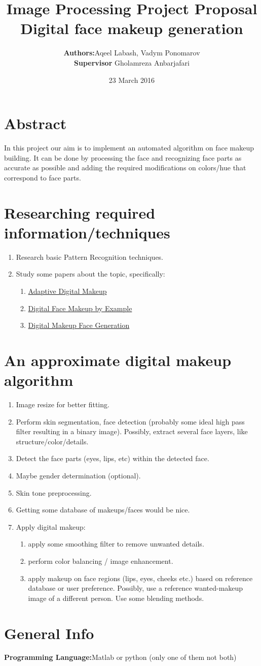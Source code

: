 \documentclass{article}
\title{Image Processing Project Proposal\\
Digital face makeup generation}
\author{\textbf{Authors:}Aqeel Labash, Vadym Ponomarov\\ 
	\textbf{Supervisor} Gholamreza Anbarjafari}
\date{23 March 2016}
\begin{document}
	\maketitle
\section*{Abstract}
In this project our aim is to implement an automated algorithm on face makeup building. It can be done by processing the face and recognizing face parts as accurate as possible and adding the required modifications on colors/hue that correspond to face parts.
\section*{Researching required information/techniques}
\begin{enumerate}
	\item Research basic Pattern Recognition techniques.
	\item Study some papers about the topic, specifically:
	\begin{enumerate}
		\item \href{http://users.cecs.anu.edu.au/~adhall/DhallSharmaBhattKhanISVC2009.pdf}{Adaptive Digital Makeup}
		\item \href{https://www.comp.nus.edu.sg/~tsim/documents/face_makeup_cvpr09_lowres.pdf}{Digital Face Makeup by Example}
		\item \href{http://web.stanford.edu/class/ee368/Project_Autumn_1516/Reports/Wut.pdf}{Digital Makeup Face Generation}
	\end{enumerate} 
\end{enumerate}
\section*{An approximate digital makeup algorithm}
\begin{enumerate}
	\item Image resize for better fitting.
	\item Perform skin segmentation, face detection (probably some ideal high pass filter resulting in a binary image). Possibly, extract several face layers, like structure/color/details.
	\item Detect the face parts (eyes, lips, etc) within the detected face.
	\item Maybe gender determination (optional).
	\item	Skin tone preprocessing.
	\item	Getting some database of makeups/faces would be nice.
	\item	Apply digital makeup:
	\begin{enumerate}
			\item	apply some smoothing filter to remove unwanted details.
			\item	perform color balancing / image enhancement.
			\item apply makeup on face regions (lips, eyes, cheeks etc.) based on reference database or user preference. Possibly, use a reference wanted-makeup image of a different person. Use some blending methods.
	\end{enumerate}
\end{enumerate}    
\section*{General Info}
\textbf{Programming Language:}Matlab or python (only one of them not both)
\end{document}

